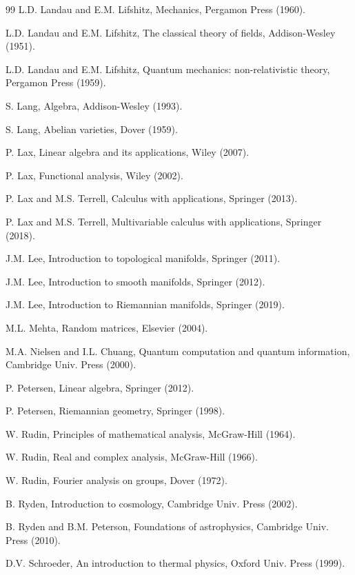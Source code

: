 \documentclass[12pt]{amsbook}
\begin{document}
\begin{thebibliography}{99}
L.D. Landau and E.M. Lifshitz, Mechanics, Pergamon Press (1960).

L.D. Landau and E.M. Lifshitz, The classical theory of fields, Addison-Wesley (1951).

L.D. Landau and E.M. Lifshitz, Quantum mechanics: non-relativistic theory, Pergamon Press (1959).

S. Lang, Algebra, Addison-Wesley (1993).

S. Lang, Abelian varieties, Dover (1959).

P. Lax, Linear algebra and its applications, Wiley (2007).

P. Lax, Functional analysis, Wiley (2002).

P. Lax and M.S. Terrell, Calculus with applications, Springer (2013).

P. Lax and M.S. Terrell, Multivariable calculus with applications, Springer (2018).

J.M. Lee, Introduction to topological manifolds, Springer (2011).

J.M. Lee, Introduction to smooth manifolds, Springer (2012).

J.M. Lee, Introduction to Riemannian manifolds, Springer (2019).

M.L. Mehta, Random matrices, Elsevier (2004).

M.A. Nielsen and I.L. Chuang, Quantum computation and quantum information, Cambridge Univ. Press (2000).

P. Petersen, Linear algebra, Springer (2012).

P. Petersen, Riemannian geometry, Springer (1998).

W. Rudin, Principles of mathematical analysis, McGraw-Hill (1964).

W. Rudin, Real and complex analysis, McGraw-Hill (1966).

W. Rudin, Fourier analysis on groups, Dover (1972).

B. Ryden, Introduction to cosmology, Cambridge Univ. Press (2002).

B. Ryden and B.M. Peterson, Foundations of astrophysics, Cambridge Univ. Press (2010).

D.V. Schroeder, An introduction to thermal physics, Oxford Univ. Press (1999).


\end{thebibliography}
\end{document}
